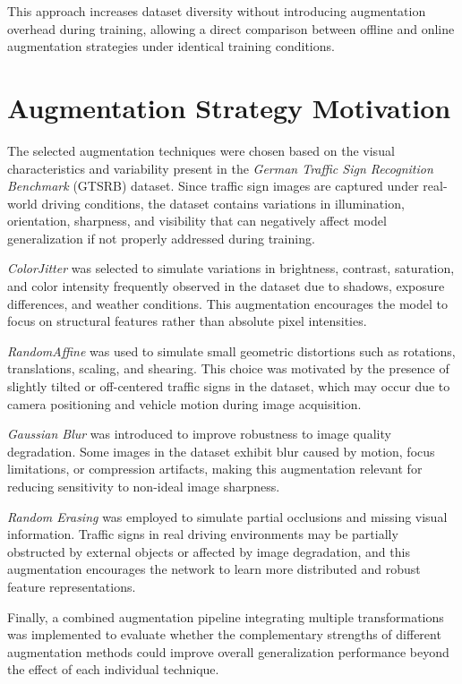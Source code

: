 \documentclass[conference]{IEEEtran}
\begin{document}
This approach increases dataset diversity without introducing augmentation overhead during training, allowing a direct comparison between offline and online augmentation strategies under identical training conditions.




\section{Augmentation Strategy Motivation}

The selected augmentation techniques were chosen based on the visual characteristics and variability present in the \textit{German Traffic Sign Recognition Benchmark} (GTSRB) dataset. Since traffic sign images are captured under real-world driving conditions, the dataset contains variations in illumination, orientation, sharpness, and visibility that can negatively affect model generalization if not properly addressed during training.

\textit{ColorJitter} was selected to simulate variations in brightness, contrast, saturation, and color intensity frequently observed in the dataset due to shadows, exposure differences, and weather conditions. This augmentation encourages the model to focus on structural features rather than absolute pixel intensities.

\textit{RandomAffine} was used to simulate small geometric distortions such as rotations, translations, scaling, and shearing. This choice was motivated by the presence of slightly tilted or off-centered traffic signs in the dataset, which may occur due to camera positioning and vehicle motion during image acquisition.

\textit{Gaussian Blur} was introduced to improve robustness to image quality degradation. Some images in the dataset exhibit blur caused by motion, focus limitations, or compression artifacts, making this augmentation relevant for reducing sensitivity to non-ideal image sharpness.

\textit{Random Erasing} was employed to simulate partial occlusions and missing visual information. Traffic signs in real driving environments may be partially obstructed by external objects or affected by image degradation, and this augmentation encourages the network to learn more distributed and robust feature representations.

Finally, a combined augmentation pipeline integrating multiple transformations was implemented to evaluate whether the complementary strengths of different augmentation methods could improve overall generalization performance beyond the effect of each individual technique.
\end{document}
